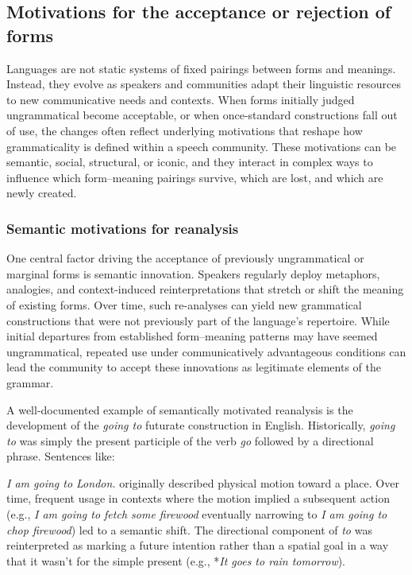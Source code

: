 \documentclass[12pt,letterpaper]{article}
\begin{document}
\subsection{Motivations for the acceptance or rejection of forms}\label{sec:motivations}

Languages are not static systems of fixed pairings between forms and meanings. Instead, they evolve as speakers and communities adapt their linguistic resources to new communicative needs and contexts. When forms initially judged ungrammatical become acceptable, or when once-standard constructions fall out of use, the changes often reflect underlying motivations that reshape how grammaticality is defined within a speech community. These motivations can be semantic, social, structural, or iconic, and they interact in complex ways to influence which form--meaning pairings survive, which are lost, and which are newly created.

\subsubsection{Semantic motivations for reanalysis}\label{subsec:semantic-motivations}

One central factor driving the acceptance of previously ungrammatical or marginal forms is semantic innovation. Speakers regularly deploy metaphors, analogies, and context-induced reinterpretations that stretch or shift the meaning of existing forms. Over time, such re-analyses can yield new grammatical constructions that were not previously part of the language’s repertoire. While initial departures from established form--meaning patterns may have seemed ungrammatical, repeated use under communicatively advantageous conditions can lead the community to accept these innovations as legitimate elements of the grammar.


A well-documented example of semantically motivated reanalysis is the development of the \textit{going to} futurate construction in English. Historically, \textit{going to} was simply the present participle of the verb \textit{go} followed by a directional phrase. Sentences like:

\ea
\textit{I am going to London.}
\z
originally described physical motion toward a place. Over time, frequent usage in contexts where the motion implied a subsequent action (e.g., \textit{I am going to fetch some firewood} eventually narrowing to \textit{I am going to chop firewood}) led to a semantic shift. The directional component of \textit{to} was reinterpreted as marking a future intention rather than a spatial goal in a way that it wasn't for the simple present (e.g., *\textit{It goes to rain tomorrow}).
\end{document}

